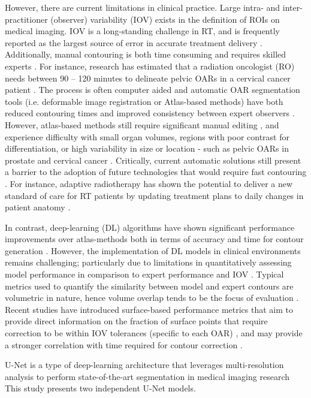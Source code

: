 However, there are current limitations in clinical practice. Large intra- and inter-practitioner (observer) variability (IOV) exists in the definition of ROIs on medical imaging. IOV is a long-standing challenge in RT, and is frequently reported as the largest source of error in accurate treatment delivery \cite{Vinod_2016, tg100}.
Additionally, manual contouring is both time consuming and requires skilled experts \cite{Nikolov_2018}. For instance, research has estimated that a radiation oncologist (RO) needs between 90 -- 120 minutes to delineate pelvic OARs in a cervical cancer patient \cite{Liu_2020}. The process is often computer aided and automatic OAR segmentation tools (i.e. deformable image registration or Atlas-based methods) have both reduced contouring times and improved consistency between expert observers \cite{Vinod_2016}. However, atlas-based methods still require significant manual editing \cite{Nikolov_2018}, and experience difficulty with small organ volumes, regions with poor contrast for differentiation, or high variability in size or location - such as pelvic OARs in prostate and cervical cancer \cite{Schreier_2020, Liu_2020}. Critically, current automatic solutions still present a barrier to the adoption of future technologies that would require fast contouring \cite{Nikolov_2018}. For instance, adaptive radiotherapy has shown the potential to deliver a new standard of care for RT patients by updating treatment plans to daily changes in patient anatomy \cite{Nikolov_2018}. 

In contrast, deep-learning (DL) algorithms have shown significant performance improvements over atlas-methods both in terms of accuracy and time for contour generation \cite{Liu_2020}. However, the implementation of DL models in clinical environments remains challenging; particularly due to limitations in quantitatively assessing model performance in comparison to expert performance and IOV \cite{Nikolov_2018}. Typical metrics used to quantify the similarity between model and expert contours are volumetric in nature, hence volume overlap tends to be the focus of evaluation \cite{Nikolov_2018}. Recent studies have introduced surface-based performance metrics that aim to provide direct information on the fraction of surface points that require correction to be within IOV tolerances (specific to each OAR) \cite{Nikolov_2018, Vaassen_2020}, and may provide a stronger correlation with time required for contour correction \cite{Vaassen_2020}.

U-Net is a type of deep-learning architecture that leverages multi-resolution analysis to perform state-of-the-art segmentation in medical imaging research \cite{Kazemifar_2018, Zhu_2018} This study presents two independent U-Net models.

